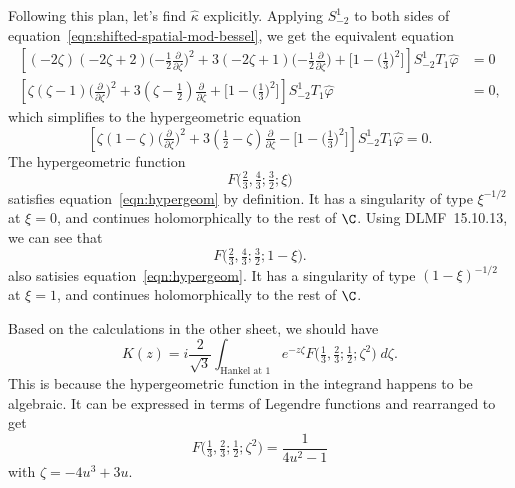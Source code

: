 \documentclass{article}
\theoremstyle{definition}
\theoremstyle{plain}
\begin{document}
Following this plan, let's find $\hat{\kappa}$ explicitly. Applying $S^1_{-2}$ to both sides of equation~\ref{eqn:shifted-spatial-mod-bessel}, we get the equivalent equation
\begin{align*}
\left[(-2\zeta)(-2\zeta + 2) \big({-\tfrac{1}{2}} \tfrac{\partial}{\partial \zeta}\big)^2 + 3(-2\zeta + 1) \big({-\tfrac{1}{2}}\tfrac{\partial}{\partial \zeta}\big) + \big[1 - \big(\tfrac{1}{3}\big)^2\big]\right] S^1_{-2} T_1 \hat{\varphi} & = 0 \\
\left[\zeta(\zeta - 1) \big(\tfrac{\partial}{\partial \zeta}\big)^2 + 3(\zeta - \tfrac{1}{2}) \tfrac{\partial}{\partial \zeta} + \big[1 - \big(\tfrac{1}{3}\big)^2\big]\right] S^1_{-2} T_1 \hat{\varphi} & = 0,
\end{align*}
which simplifies to the hypergeometric equation
\begin{equation}\label{eqn:hypergeom}
\left[\zeta(1 - \zeta) \big(\tfrac{\partial}{\partial \zeta}\big)^2 + 3(\tfrac{1}{2} - \zeta) \tfrac{\partial}{\partial \zeta} - \big[1 - \big(\tfrac{1}{3}\big)^2\big]\right] S^1_{-2} T_1 \hat{\varphi} = 0.
\end{equation}
The hypergeometric function
\[ F\big(\tfrac{2}{3}, \tfrac{4}{3}; \tfrac{3}{2}; \xi\big) \]
satisfies equation~\ref{eqn:hypergeom} by definition. It has a singularity of type $\xi^{-1/2}$ at $\xi = 0$, and continues holomorphically to the rest of $\C$. Using DLMF~15.10.13, we can see that
\[ F\big(\tfrac{2}{3}, \tfrac{4}{3}; \tfrac{3}{2}; 1-\xi\big). \]
also satisies equation~\ref{eqn:hypergeom}. It has a singularity of type $(1 - \xi)^{-1/2}$ at $\xi = 1$, and continues holomorphically to the rest of $\C$.

Based on the calculations in the other sheet, we should have
\[ K(z) = i \frac{2}{\sqrt{3}} \int_{\text{Hankel at } 1} e^{-z\zeta} F\big(\tfrac{1}{3}, \tfrac{2}{3}; \tfrac{1}{2}; \zeta^2\big)\;d\zeta. \]
This is because the hypergeometric function in the integrand happens to be algebraic. It can be expressed in terms of Legendre functions and rearranged to get
\[ F\big(\tfrac{1}{3}, \tfrac{2}{3}; \tfrac{1}{2}; \zeta^2\big) = \frac{1}{4u^2 - 1} \]
with $\zeta = -4u^3 + 3u$.
\end{document}
